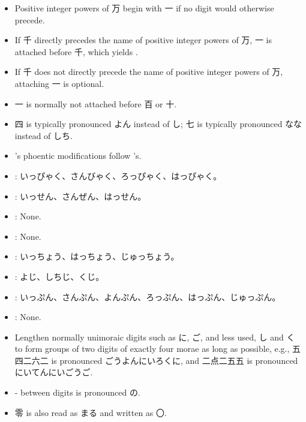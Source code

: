 \documentclass[a4paper,12pt]{article}
\begin{document}
\begin{itemize}
\item Positive integer powers of 万 begin with 一 if no digit would otherwise precede.
\item If 千 directly precedes the name of positive integer powers of 万, 一 is attached before 千, which yields .
\item If 千 does not directly precede the name of positive integer powers of 万, attaching 一 is optional.
\item 一 is normally not attached before 百 or 十.
\end{itemize}
\begin{itemize}
\item 四 is typically pronounced よん instead of し; 七 is typically pronounced なな instead of しち.
\item {}'s phoentic modifications follow 's.
\item {}: いっぴゃく、さんびゃく、ろっぴゃく、はっぴゃく。
\item {}: いっせん、さんぜん、はっせん。
\item {}: None.
\item {}: None.
\item {}: いっちょう、はっちょう、じゅっちょう。
\item {}: よじ、しちじ、くじ。
\item {}: いっぷん、さんぷん、よんぷん、ろっぷん、はっぷん、じゅっぷん。
\item {}: None.
\end{itemize}
\begin{itemize}
\item Lengthen normally unimoraic digits such as に, ご, and less used, し and く to form groups of two digits of exactly four morae as long as possible, e.g., 五四二六二 is pronounced ごうよんにいろくに, and 二点二五五 is pronounced にいてんにいごうご.
\item - between digits is pronounced の.
\item 零 is also read as まる and written as 〇.
\end{itemize}
\end{document}
